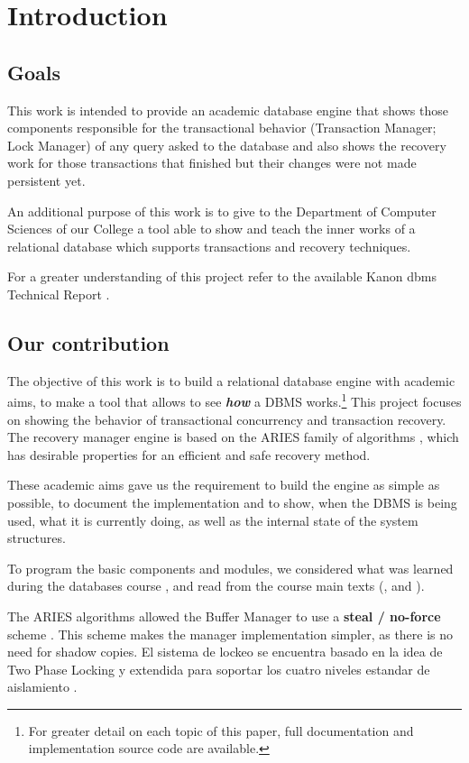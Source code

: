 \section{Introduction}

\subsection{Goals}

This work is intended to provide an academic database engine that shows those components responsible for the transactional behavior (Transaction Manager; Lock Manager) of any query asked to the database and also shows the recovery work for those transactions that finished but their changes were not made persistent yet.

An additional purpose of this work is to give to the Department of Computer Sciences \cite{FCENDC} of our College \cite{FCEN} a tool able to show and teach the inner works of a relational database which supports transactions and recovery techniques.

For a greater understanding of this project refer to the available Kanon dbms Technical Report \cite{LBCP07b}.

\subsection{Our contribution}

The objective of this work is to build a relational database engine with academic aims, to make a tool that allows to see \textbf{\textit {how}} a DBMS works.\footnote{For greater detail on each topic of this paper, full documentation and implementation source code are available.} This project focuses on showing the behavior of transactional concurrency and transaction recovery. The recovery manager engine is based on the ARIES family of algorithms \cite {MHLPS89}, which has desirable properties for an efficient and safe recovery method.

These academic aims gave us the requirement to build the engine as simple as possible, to document the implementation and to show, when the DBMS is being used, what it is currently doing, as well as the internal state of the system structures.

To program the basic components and modules, we considered what was learned during the databases course \cite{FCENBD}, and read from the course main texts (\cite{RaGh03}, \cite{Ullm88} and \cite{BeHG87}).

The ARIES algorithms allowed the Buffer Manager to use a \textbf{steal / no-force} scheme \cite{RaGh03}. This scheme makes the manager implementation simpler, as there is no need for shadow copies.  El sistema de lockeo se encuentra basado en la idea de Two Phase Locking  y extendida para soportar los cuatro niveles estandar de aislamiento \cite{WIISLE}.

